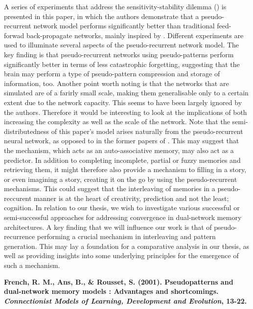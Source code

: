 A series of experiments that address the sensitivity-stability dilemma (\cite{Hebb1949}) is presented in this paper, in which the authors demonstrate that a pseudo-recurrent network model performs significantly better than traditional feed-forwad back-propagate networks, mainly inspired by \cite{McClelland1995}. Different experiments are used to illuminate several aspects of the pseudo-recurrent network model. The key finding is that pseudo-recurrent networks using pseudo-patterns perform significantly better in terms of less catastrophic forgetting, suggesting that the brain may perform a type of pseudo-pattern compression and storage of information, too. Another point worth noting is that the networks that are simulated are of a farirly small scale, making them generalisable only to a certain extent due to the network capacity. This seems to have been largely ignored by the authors. Therefore it would be interesting to look at the implications of both increasing the complexity as well as the scale of the network. Note that the semi-distributedness of this paper's model arises naturally from the pseudo-recurrent neural network, as opposed to in the former papers of \cite{French1992, French1994}. This may suggest that the mechanism, which acts as an auto-associative memory, may also act as a predictor. In addition to completing incomplete, partial or fuzzy memories and retrieving them, it might therefore also provide a mechanism to filling in a story, or even imagining a story, creating it on the go by using the pseudo-recurrent mechanisms. This could suggest that the interleaving of memories in a pseudo-reccurent manner is at the heart of creativity, prediction and not the least; cognition. In relation to our thesis, we wish to investigate various successful or semi-successful approaches for addressing convergence in dual-network memory architectures. A key finding that we will influence our work is that of pseudo-recurrence performing a crucial mechanism in interleaving and pattern generation. This may lay a foundation for a comparative analysis in our thesis, as well as providing insights into some underlying principles for the emergence of such a mechanism.

\textbf{French, R. M., Ans, B., \& Rousset, S. (2001). Pseudopatterns and dual-network memory models : Advantages and shortcomings. \textit{Connectionist Models of Learning, Development and Evolution}, 13-22.}

